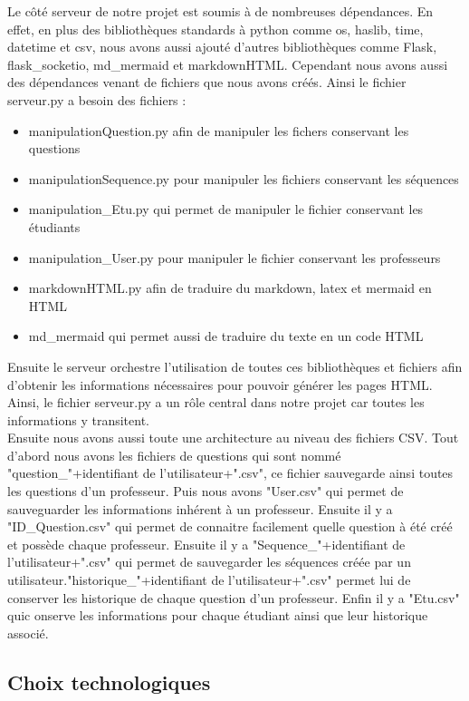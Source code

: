 \documentclass[a4paper, 12pt]{article}
\begin{document}
Le côté serveur de notre projet est soumis à de nombreuses dépendances.
En effet, en plus des bibliothèques standards à python comme os, haslib, time, datetime et csv, nous avons aussi ajouté d'autres bibliothèques comme Flask, flask\_socketio, md\_mermaid et markdownHTML. 
Cependant nous avons aussi des dépendances venant de fichiers que nous avons créés.
Ainsi le fichier serveur.py a besoin des fichiers :
\begin{itemize}
    \item manipulationQuestion.py afin de manipuler les fichers conservant les questions
    \item manipulationSequence.py pour manipuler les fichiers conservant les séquences
    \item manipulation\_Etu.py qui permet de manipuler le fichier conservant les étudiants
    \item manipulation\_User.py pour manipuler le fichier conservant les professeurs
    \item markdownHTML.py afin de traduire du markdown, latex et mermaid en HTML
    \item md\_mermaid qui permet aussi de traduire du texte en un code HTML
\end{itemize}
Ensuite le serveur orchestre l'utilisation de toutes ces bibliothèques et fichiers afin d'obtenir les informations nécessaires pour pouvoir générer les pages HTML. 
Ainsi, le fichier serveur.py a un rôle central dans notre projet car toutes les informations y transitent.\\
    Ensuite nous avons aussi toute une architecture au niveau des fichiers CSV. Tout d'abord nous avons les
fichiers de questions qui sont nommé "question\_"+identifiant de l'utilisateur+".csv", ce fichier 
sauvegarde ainsi toutes les questions d'un professeur. Puis nous avons "User.csv" qui permet de 
sauveguarder les informations inhérent à un professeur. Ensuite il y a "ID\_Question.csv" qui
permet de connaitre facilement quelle question à été créé et possède chaque professeur.
Ensuite il y a "Sequence\_"+identifiant de l'utilisateur+".csv" qui permet de sauvegarder les séquences
créée par un utilisateur."historique\_"+identifiant de l'utilisateur+".csv" permet lui de conserver les
historique de chaque question d'un professeur. Enfin il y a "Etu.csv" quic onserve les informations pour chaque étudiant ainsi que leur historique associé.

\subsection{Choix technologiques}
\end{document}
